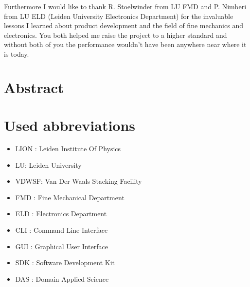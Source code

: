 \documentclass[10pt]{article}
\begin{document}
Furthermore I would like to thank R. Stoelwinder from LU FMD and P. Nimberi from LU ELD (Leiden University Electronics Department) for the invaluable lessons I learned about product development and the field of fine mechanics and electronics.
You both helped me raise the project to a higher standard and without both of you the performance wouldn't have been anywhere near where it is today.


\clearpage

\section*{Abstract}
\clearpage

\newpage

\tableofcontents
\newpage

\section*{Used abbreviations}
\label{ap:veel_gebruikte_symbolen}
\begin{itemize}[noitemsep]
    \item LION : Leiden Institute Of Physics
    \item LU: Leiden University
    \item VDWSF: Van Der Waals Stacking Facility
    \item FMD : Fine Mechanical Department
    \item ELD : Electronics Department
    \item CLI : Command Line Interface
    \item GUI : Graphical User Interface
    \item SDK : Software Development Kit
    \item DAS : Domain Applied Science

\end{itemize}

\clearpage
{}
\end{document}
